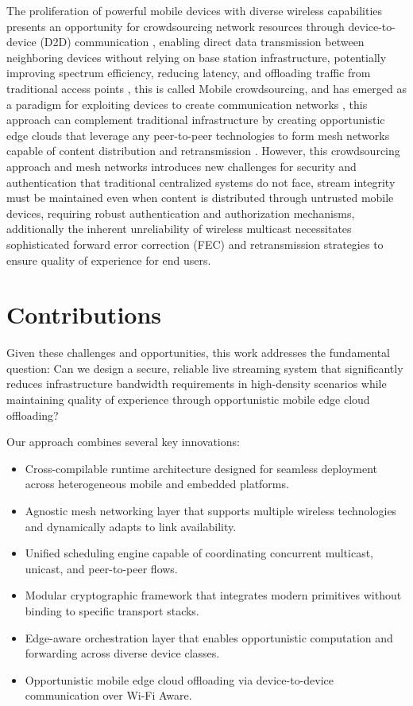 \quad The proliferation of powerful mobile devices with diverse wireless capabilities presents an opportunity for crowdsourcing network resources through device-to-device (D2D) communication \cite{desauw2023criticalreviewmobiledevicetodevice}, enabling direct data transmission between neighboring devices without relying on base station infrastructure, potentially improving spectrum efficiency, reducing latency, and offloading traffic from traditional access points \cite{iotngin2022}, this is called Mobile crowdsourcing, and has emerged as a paradigm for exploiting devices to create communication networks \cite{springer2023}, this approach can complement traditional infrastructure by creating opportunistic edge clouds that leverage any peer-to-peer technologies to form mesh networks capable of content distribution and retransmission \cite{crowdsourcing2020}. However, this crowdsourcing approach and mesh networks introduces new challenges for security and authentication that traditional centralized systems do not face, stream integrity must be maintained even when content is distributed through untrusted mobile devices, requiring robust authentication and authorization mechanisms, additionally the inherent unreliability of wireless multicast necessitates sophisticated forward error correction (FEC) and retransmission strategies to ensure quality of experience for end users. 

\section{Contributions}

\quad Given these challenges and opportunities, this work addresses the fundamental question: Can we design a secure, reliable live streaming system that significantly reduces infrastructure bandwidth requirements in high-density scenarios while maintaining quality of experience through opportunistic mobile edge cloud offloading? 

Our approach combines several key innovations: 

\begin{itemize}
	\item Cross-compilable runtime architecture designed for seamless deployment across heterogeneous mobile and embedded platforms.
	\item Agnostic mesh networking layer that supports multiple wireless technologies and dynamically adapts to link availability.
	\item Unified scheduling engine capable of coordinating concurrent multicast, unicast, and peer-to-peer flows.
	\item Modular cryptographic framework that integrates modern primitives without binding to specific transport stacks.
	\item Edge-aware orchestration layer that enables opportunistic computation and forwarding across diverse device classes.
	\item Opportunistic mobile edge cloud offloading via device-to-device communication over Wi-Fi Aware.
\end{itemize}

